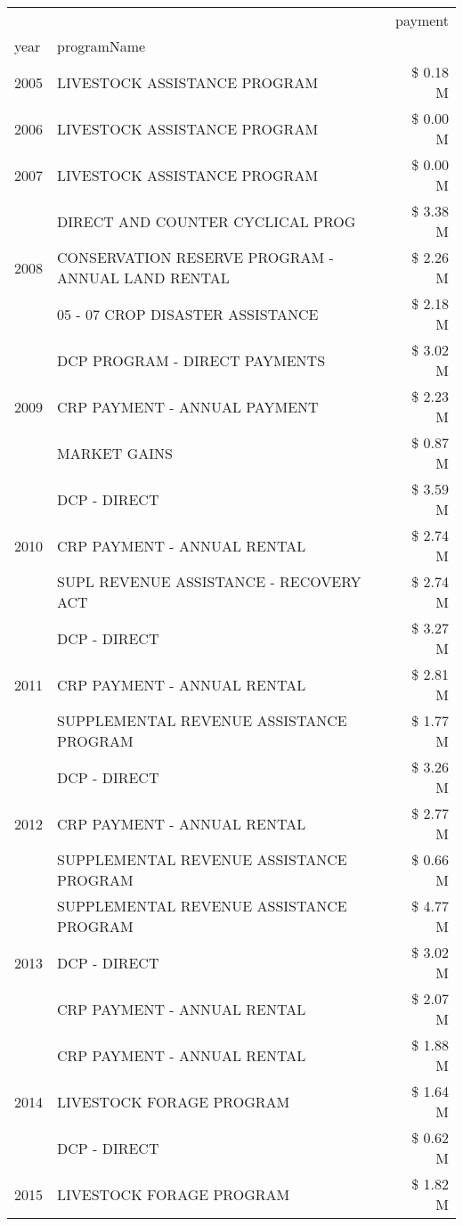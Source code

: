 \begin{tabular}{llr}
\toprule
 &  & payment \\
year & programName &  \\
\midrule
2005 & LIVESTOCK ASSISTANCE PROGRAM & \$ 0.18 M \\
\cline{1-3}
2006 & LIVESTOCK ASSISTANCE PROGRAM & \$ 0.00 M \\
\cline{1-3}
2007 & LIVESTOCK ASSISTANCE PROGRAM & \$ 0.00 M \\
\cline{1-3}
\multirow[t]{3}{*}{2008} & DIRECT AND COUNTER CYCLICAL PROG & \$ 3.38 M \\
 & CONSERVATION RESERVE PROGRAM - ANNUAL LAND RENTAL & \$ 2.26 M \\
 & 05 - 07 CROP DISASTER ASSISTANCE & \$ 2.18 M \\
\cline{1-3}
\multirow[t]{3}{*}{2009} & DCP PROGRAM - DIRECT PAYMENTS & \$ 3.02 M \\
 & CRP PAYMENT - ANNUAL PAYMENT & \$ 2.23 M \\
 & MARKET GAINS & \$ 0.87 M \\
\cline{1-3}
\multirow[t]{3}{*}{2010} & DCP - DIRECT & \$ 3.59 M \\
 & CRP PAYMENT - ANNUAL RENTAL & \$ 2.74 M \\
 & SUPL REVENUE ASSISTANCE - RECOVERY ACT & \$ 2.74 M \\
\cline{1-3}
\multirow[t]{3}{*}{2011} & DCP - DIRECT & \$ 3.27 M \\
 & CRP PAYMENT - ANNUAL RENTAL & \$ 2.81 M \\
 & SUPPLEMENTAL REVENUE ASSISTANCE PROGRAM & \$ 1.77 M \\
\cline{1-3}
\multirow[t]{3}{*}{2012} & DCP - DIRECT & \$ 3.26 M \\
 & CRP PAYMENT - ANNUAL RENTAL & \$ 2.77 M \\
 & SUPPLEMENTAL REVENUE ASSISTANCE PROGRAM & \$ 0.66 M \\
\cline{1-3}
\multirow[t]{3}{*}{2013} & SUPPLEMENTAL REVENUE ASSISTANCE PROGRAM & \$ 4.77 M \\
 & DCP - DIRECT & \$ 3.02 M \\
 & CRP PAYMENT - ANNUAL RENTAL & \$ 2.07 M \\
\cline{1-3}
\multirow[t]{3}{*}{2014} & CRP PAYMENT - ANNUAL RENTAL & \$ 1.88 M \\
 & LIVESTOCK FORAGE PROGRAM & \$ 1.64 M \\
 & DCP - DIRECT & \$ 0.62 M \\
\cline{1-3}
\multirow[t]{3}{*}{2015} & LIVESTOCK FORAGE PROGRAM & \$ 1.82 M \\

\end{tabular}
